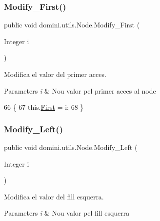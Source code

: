 \subsubsection{\texorpdfstring{Modify\+\_\+\+First()}{Modify\_First()}}
{\footnotesize\ttfamily public void domini.\+utils.\+Node.\+Modify\+\_\+\+First (\begin{DoxyParamCaption}\item[{Integer}]{i }\end{DoxyParamCaption})\hspace{0.3cm}{\ttfamily [inline]}}



Modifica el valor del primer acces. 


\begin{DoxyParams}{Parameters}
{\em i} & Nou valor pel primer acces al node \\
\hline
\end{DoxyParams}

\begin{DoxyCode}
66                                         \{
67         this.\hyperlink{classdomini_1_1utils_1_1Node_a42db9f259f129c72cab2052a0f8ba42a}{First} = i;
68     \}
\end{DoxyCode}
\mbox{\label{classdomini_1_1utils_1_1Node_a5a1cbd1e7f1fd78b42050f563520a709}} 
\subsubsection{\texorpdfstring{Modify\+\_\+\+Left()}{Modify\_Left()}}
{\footnotesize\ttfamily public void domini.\+utils.\+Node.\+Modify\+\_\+\+Left (\begin{DoxyParamCaption}\item[{Integer}]{i }\end{DoxyParamCaption})\hspace{0.3cm}{\ttfamily [inline]}}



Modifica el valor del fill esquerra. 


\begin{DoxyParams}{Parameters}
{\em i} & Nou valor pel fill esquerra \\
\hline
\end{DoxyParams}

